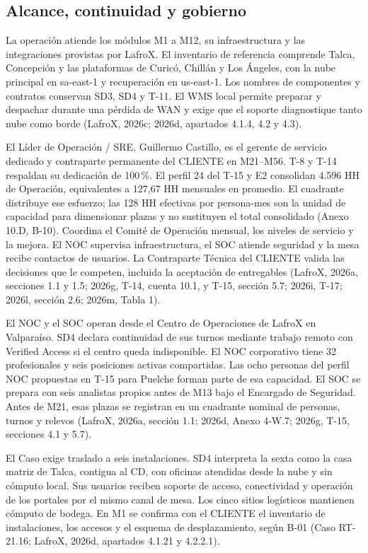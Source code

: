 \subsection{Alcance, continuidad y gobierno}
\label{sub:sd10-alcance}

La operación atiende los módulos M1 a M12, su infraestructura y las integraciones provistas por LafroX. El inventario de referencia comprende Talca, Concepción y las plataformas de Curicó, Chillán y Los Ángeles, con la nube principal en sa-east-1 y recuperación en us-east-1. Los nombres de componentes y contratos conservan SD3, SD4 y T-11. El WMS local permite preparar y despachar durante una pérdida de WAN y exige que el soporte diagnostique tanto nube como borde (LafroX, 2026c; 2026d, apartados 4.1.4, 4.2 y 4.3).

El Líder de Operación / SRE, Guillermo Castillo, es el gerente de servicio dedicado y contraparte permanente del CLIENTE en M21--M56. T-8 y T-14 respaldan su dedicación de 100\,\%. El perfil 24 del T-15 y E2 consolidan 4.596 HH de Operación, equivalentes a 127,67 HH mensuales en promedio. El cuadrante distribuye ese esfuerzo; las 128 HH efectivas por persona-mes son la unidad de capacidad para dimensionar plazas y no sustituyen el total consolidado (Anexo 10.D, B-10). Coordina el Comité de Operación mensual, los niveles de servicio y la mejora. El NOC supervisa infraestructura, el SOC atiende seguridad y la mesa recibe contactos de usuarios. La Contraparte Técnica del CLIENTE valida las decisiones que le competen, incluida la aceptación de entregables (LafroX, 2026a, secciones 1.1 y 1.5; 2026g, T-14, cuenta 10.1, y T-15, sección 5.7; 2026i, T-17; 2026l, sección 2.6; 2026m, Tabla 1).

El NOC y el SOC operan desde el Centro de Operaciones de LafroX en Valparaíso. SD4 declara continuidad de sus turnos mediante trabajo remoto con Verified Access si el centro queda indisponible. El NOC corporativo tiene 32 profesionales y seis posiciones activas compartidas. Las ocho personas del perfil NOC propuestas en T-15 para Puelche forman parte de esa capacidad. El SOC se prepara con seis analistas propios antes de M13 bajo el Encargado de Seguridad. Antes de M21, esas plazas se registran en un cuadrante nominal de personas, turnos y relevos (LafroX, 2026a, sección 1.1; 2026d, Anexo 4-W.7; 2026g, T-15, secciones 4.1 y 5.7).

El Caso exige traslado a seis instalaciones. SD4 interpreta la sexta como la casa matriz de Talca, contigua al CD, con oficinas atendidas desde la nube y sin cómputo local. Sus usuarios reciben soporte de acceso, conectividad y operación de los portales por el mismo canal de mesa. Los cinco sitios logísticos mantienen cómputo de bodega. En M1 se confirma con el CLIENTE el inventario de instalaciones, los accesos y el esquema de desplazamiento, según B-01 (Caso RT-21.16; LafroX, 2026d, apartados 4.1.21 y 4.2.2.1).

